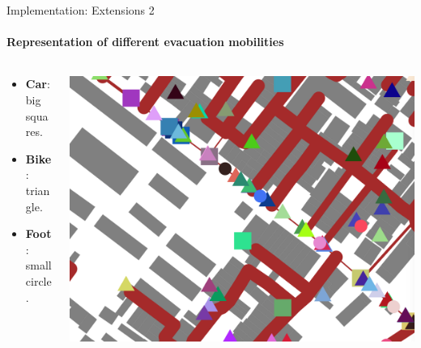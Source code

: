 \documentclass{beamer}
\begin{document}
\begin{frame}[fragile]{Implementation: Extensions 2}
\framesubtitle{Representation of different evacuation mobilities}

\begin{columns}
\begin{column}{0.4\textwidth}

\begin{itemize}
    \item \textbf{Car}: big squares.
    \item \textbf{Bike}: triangle.
    \item \textbf{Foot}: small circle.
\end{itemize}
\end{column}

\begin{column}{0.6\textwidth}
    \includegraphics[width=\textwidth]{img/Mobilities.png}
\end{column}

\end{columns}

\end{frame}
\end{document}
